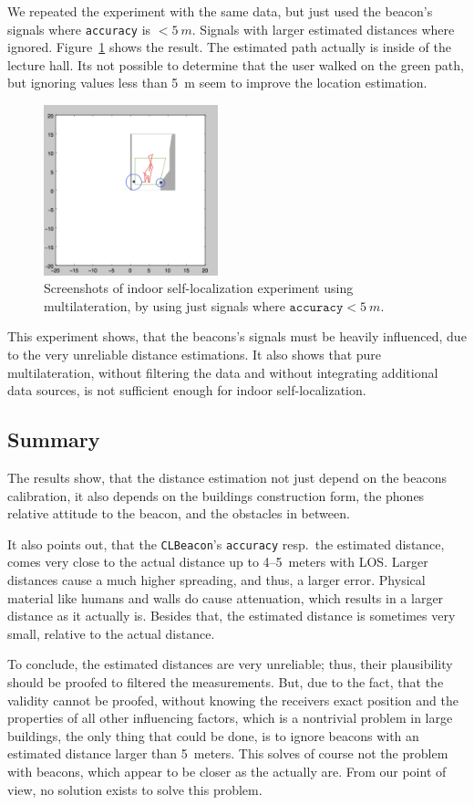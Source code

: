 We repeated the experiment with the same data, but just used the beacon's signals where \texttt{accuracy} is $< 5~m$. Signals with larger estimated distances where ignored. Figure~\ref{fig:beacon_eval_multilat_less5m} shows the result. The estimated path actually is inside of the lecture hall. Its not possible to determine that the user walked on the green path, but ignoring values less than 5~m seem to improve the location estimation.

\begin{figure}
	\includegraphics[width=0.45\textwidth]{figures/multilat_less5m}
	\caption{Screenshots of indoor self-localization experiment using multilateration, by using just signals where $\texttt{accuracy} < 5~m$.}
	\label{fig:beacon_eval_multilat_less5m}
\end{figure}

This experiment shows, that the beacons's signals must be heavily influenced, due to the very unreliable distance estimations. It also shows that pure multilateration, without filtering the data and without integrating additional data sources, is not sufficient enough for indoor self-localization.

\subsection{Summary}
The results show, that the distance estimation not just depend on the beacons calibration, it also depends on the buildings construction form, the phones relative attitude to the beacon, and the obstacles in between.

It also points out, that the \texttt{CLBeacon}'s \texttt{accuracy} resp.\ the estimated distance, comes very close to the actual distance up to 4--5~meters with \acs{LOS}. Larger distances cause a much higher spreading, and thus, a larger error. Physical material like humans and walls do cause attenuation, which results in a larger distance as it actually is. Besides that, the estimated distance is sometimes very small, relative to the actual distance.

To conclude, the estimated distances are very unreliable; thus, their plausibility should be proofed to filtered the measurements. But, due to the fact, that the validity cannot be proofed, without knowing the receivers exact position and the properties of all other influencing factors, which is a nontrivial problem in large buildings, the only thing that could be done, is to ignore beacons with an estimated distance larger than 5~meters. This solves of course not the problem with beacons, which appear to be closer as the actually are. From our point of view, no solution exists to solve this problem.